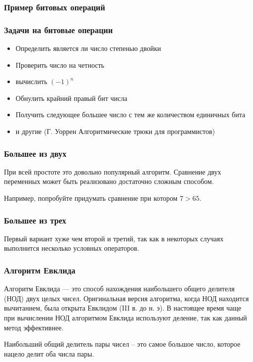 \begin{frame}[fragile]
\frametitle{Пример битовых операций}



\end{frame}

\begin{frame}[fragile]
\frametitle{Задачи на битовые операции}

\begin{itemize}
 \item Определить является ли число степенью двойки
 \item Проверить число на четность
 \item вычислить $(-1)^n$
 \item Обнулить крайний правый бит числа
 \item Получить следующее большее число с тем же количеством единичных бита
 \item и другие (Г. Уоррен Алгоритмические трюки для программистов)
 
\end{itemize}


\end{frame}



\begin{frame}[fragile]
\frametitle{Большее из двух}



При всей простоте это довольно популярный алгоритм. Сравнение двух переменных может быть реализовано достаточно сложным способом.

Например, попробуйте придумать сравнение при котором $7>65$.

\end{frame}

\begin{frame}[fragile]
\frametitle{Большее из трех}



Первый вариант хуже чем второй и третий, так как в некоторых случаях выполнится несколько условных операторов.

\end{frame}

\begin{frame}[fragile]
\frametitle{Алгоритм Евклида}

Алгоритм Евклида — это способ нахождения наибольшего общего делителя (НОД) двух целых чисел. Оригинальная версия алгоритма, когда НОД находится вычитанием, была открыта Евклидом (III в. до н. э). В настоящее время чаще при вычислении НОД алгоритмом Евклида используют деление, так как данный метод эффективнее.

Наибольший общий делитель пары чисел – это самое большое число, которое нацело делит оба числа пары. 

\end{frame}

